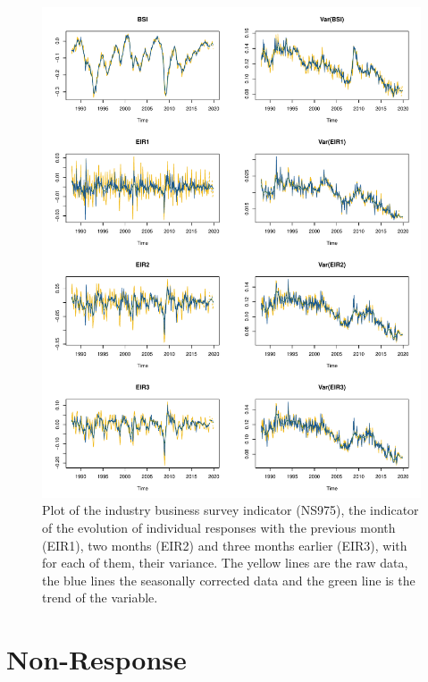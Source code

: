 \documentclass[12pt,a4paper,oneside]{book}
\begin{document}
 
\begin{figure}[htp!]
    \centering
    \includegraphics[scale=0.75]{Graphs/RJDemetra_plots.pdf}
    \caption{Plot of the industry business survey indicator (NS975), the indicator of the evolution of individual responses with the previous month (EIR1), two months (EIR2) and three months earlier (EIR3), with for each of them, their variance. The yellow lines are the raw data, the blue lines the seasonally corrected data and the green line is the trend of the variable.}
    \label{fig:seasonal ajusted rjdemetra}
\end{figure}


\section{Non-Response}

\end{document}
